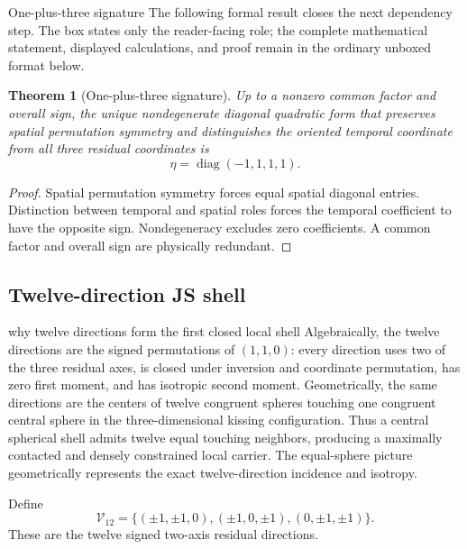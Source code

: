 \documentclass[11pt]{article}
\numberwithin{equation}{section}
\newtheorem{theorem}[definition]{Theorem}
\theoremstyle{remark}
\newcommand{\diag}{\operatorname{diag}}
\begin{document}
\begin{proofguide}{One-plus-three signature}
The following formal result closes the next dependency step. The box states only the reader-facing role; the complete mathematical statement, displayed calculations, and proof remain in the ordinary unboxed format below.
\end{proofguide}
\begin{theorem}[One-plus-three signature]
Up to a nonzero common factor and overall sign, the unique nondegenerate diagonal quadratic form that preserves spatial permutation symmetry and distinguishes the oriented temporal coordinate from all three residual coordinates is
\begin{equation}
\eta=\diag(-1,1,1,1).
\end{equation}
\end{theorem}
\begin{proof}
Spatial permutation symmetry forces equal spatial diagonal entries. Distinction between temporal and spatial roles forces the temporal coefficient to have the opposite sign. Nondegeneracy excludes zero coefficients. A common factor and overall sign are physically redundant.
\end{proof}

\subsection{Twelve-direction JS shell}
\begin{conceptledger}{why twelve directions form the first closed local shell}
Algebraically, the twelve directions are the signed permutations of $(1,1,0)$: every direction uses two of the three residual axes, is closed under inversion and coordinate permutation, has zero first moment, and has isotropic second moment. Geometrically, the same directions are the centers of twelve congruent spheres touching one congruent central sphere in the three-dimensional kissing configuration. Thus a central spherical shell admits twelve equal touching neighbors, producing a maximally contacted and densely constrained local carrier. The equal-sphere picture geometrically represents the exact twelve-direction incidence and isotropy.
\end{conceptledger}

Define
\begin{equation}
\mathcal V_{12}=\{(\pm1,\pm1,0),(\pm1,0,\pm1),(0,\pm1,\pm1)\}.
\end{equation}
These are the twelve signed two-axis residual directions.
\end{document}
